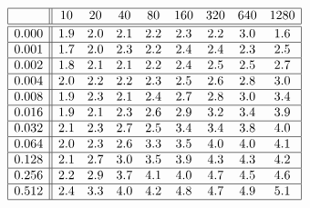 \[
\begin{array}{|c||cccccccc|}
\hline 
& 10 & 20 & 40 & 80 & 160 & 320 & 640 & 1280\\
\hline \hline 
0.000 & 1.9 & 2.0 & 2.1 & 2.2 & 2.3 & 2.2 & 3.0 & 1.6 \\ \hline 
0.001 & 1.7 & 2.0 & 2.3 & 2.2 & 2.4 & 2.4 & 2.3 & 2.5 \\ \hline 
0.002 & 1.8 & 2.1 & 2.1 & 2.2 & 2.4 & 2.5 & 2.5 & 2.7 \\ \hline 
0.004 & 2.0 & 2.2 & 2.2 & 2.3 & 2.5 & 2.6 & 2.8 & 3.0 \\ \hline 
0.008 & 1.9 & 2.3 & 2.1 & 2.4 & 2.7 & 2.8 & 3.0 & 3.4 \\ \hline 
0.016 & 1.9 & 2.1 & 2.3 & 2.6 & 2.9 & 3.2 & 3.4 & 3.9 \\ \hline 
0.032 & 2.1 & 2.3 & 2.7 & 2.5 & 3.4 & 3.4 & 3.8 & 4.0 \\ \hline 
0.064 & 2.0 & 2.3 & 2.6 & 3.3 & 3.5 & 4.0 & 4.0 & 4.1 \\ \hline 
0.128 & 2.1 & 2.7 & 3.0 & 3.5 & 3.9 & 4.3 & 4.3 & 4.2 \\ \hline 
0.256 & 2.2 & 2.9 & 3.7 & 4.1 & 4.0 & 4.7 & 4.5 & 4.6 \\ \hline 
0.512 & 2.4 & 3.3 & 4.0 & 4.2 & 4.8 & 4.7 & 4.9 & 5.1 \\ \hline 
\end{array}
\]

